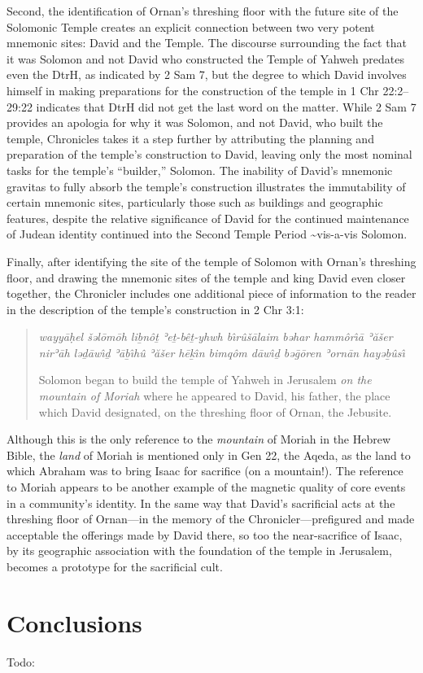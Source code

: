 Second, the identification of Ornan's threshing floor with the future
site of the Solomonic Temple creates an explicit connection between two
very potent mnemonic sites: David and the Temple. The discourse
surrounding the fact that it was Solomon and not David who constructed
the Temple of Yahweh predates even the DtrH, as indicated by 2 Sam 7,
but the degree to which David involves himself in making preparations
for the construction of the temple in 1 Chr 22:2--29:22 indicates that
DtrH did not get the last word on the matter. While 2 Sam 7 provides an
apologia for why it was Solomon, and not David, who built the temple,
Chronicles takes it a step further by attributing the planning and
preparation of the temple's construction to David, leaving only the most
nominal tasks for the temple's ``builder,'' Solomon. The inability of
David's mnemonic gravitas to fully absorb the temple's construction
illustrates the immutability of certain mnemonic sites, particularly
those such as buildings and geographic features, despite the relative
significance of David for the continued maintenance of Judean identity
continued into the Second Temple Period \textasciitilde{}vis-a-vis
Solomon.

Finally, after identifying the site of the temple of Solomon with
Ornan's threshing floor, and drawing the mnemonic sites of the temple
and king David even closer together, the Chronicler includes one
additional piece of information to the reader in the description of the
temple's construction in 2 Chr 3:1:

\begin{quote}
\emph{wayyāḥel šəlōmōh liḇnôṯ ʾeṯ-bêṯ-yhwh bı̂rûšālaim bəhar hammôrı̂ā
ʾăšer nirʾāh ləḏāwı̂ḏ ʾāḇı̂hû ʾăšer hēḵı̂n bimqôm dāwı̂ḏ bəḡōren ʾornān
hayəḇûsı̂}

Solomon began to build the temple of Yahweh in Jerusalem \emph{on the
mountain of Moriah} where he appeared to David, his father, the place
which David designated, on the threshing floor of Ornan, the Jebusite.
\end{quote}

Although this is the only reference to the \emph{mountain} of Moriah in
the Hebrew Bible, the \emph{land} of Moriah is mentioned only in Gen 22,
the Aqeda, as the land to which Abraham was to bring Isaac for sacrifice
(on a mountain!).\autocite[358--359]{kalimi_htr1990} The reference to
Moriah appears to be another example of the magnetic quality of core
events in a community's identity. In the same way that David's
sacrificial acts at the threshing floor of Ornan---in the memory of the
Chronicler---prefigured and made acceptable the offerings made by David
there, so too the near-sacrifice of Isaac, by its geographic association
with the foundation of the temple in Jerusalem, becomes a prototype for
the sacrificial cult.\autocite[In fact, Vermes makes this point explicit
and traces the tradition into early Christianity.
See][204--211]{vermes1961}

\section{Conclusions}\label{conclusions}

Todo:
